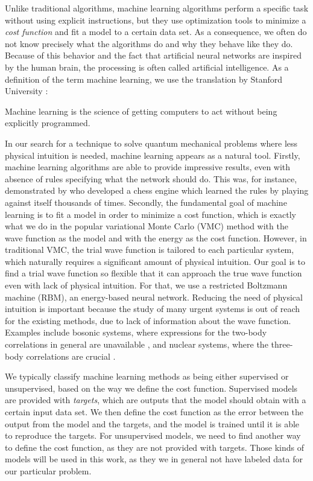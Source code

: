 Unlike traditional algorithms, machine learning algorithms perform a specific task without using explicit instructions, but they use optimization tools to minimize a \textit{cost function} and fit a model to a certain data set. As a consequence, we often do not know precisely what the algorithms do and why they behave like they do. Because of this behavior and the fact that artificial neural networks are inspired by the human brain, the processing is often called artificial intelligence. As a definition of the term machine learning, we use the translation by Stanford University \supercite{noauthor_machine_nodate}:

\begin{shadequote}{}
	Machine learning is the science of getting computers to act without being explicitly programmed.
\end{shadequote}

In our search for a technique to solve quantum mechanical problems where less physical intuition is needed, machine learning appears as a natural tool. Firstly, machine learning algorithms are able to provide impressive results, even with absence of rules specifying what the network should do. This was, for instance, demonstrated by \citet{silver2017mastering} who developed a chess engine which learned the rules by playing against itself thousands of times. Secondly, the fundamental goal of machine learning is to fit a model in order to minimize a cost function, which is exactly what we do in the popular variational Monte Carlo (VMC) method with the wave function as the model and with the energy as the cost function. However, in traditional VMC, the trial wave function is tailored to each particular system, which naturally requires a significant amount of physical intuition. Our goal is to find a trial wave function so flexible that it can approach the true wave function even with lack of physical intuition. For that, we use a restricted Boltzmann machine (RBM), an energy-based neural network. Reducing the need of physical intuition is important because the study of many urgent systems is out of reach for the existing methods, due to lack of information about the wave function. Examples include bosonic systems, where expressions for the two-body correlations in general are unavailable \supercite{holzmann_pair_1999}, and nuclear systems, where the three-body correlations are crucial \supercite{sauer_three-nucleon_2014}.

We typically classify machine learning methods as being either supervised or unsupervised, based on the way we define the cost function. Supervised models are provided with \textit{targets}, which are outputs that the model should obtain with a certain input data set. We then define the cost function as the error between the output from the model and the targets, and the model is trained until it is able to reproduce the targets. For unsupervised models, we need to find another way to define the cost function, as they are not provided with targets. Those kinds of models will be used in this work, as they we in general not have labeled data for our particular problem.

